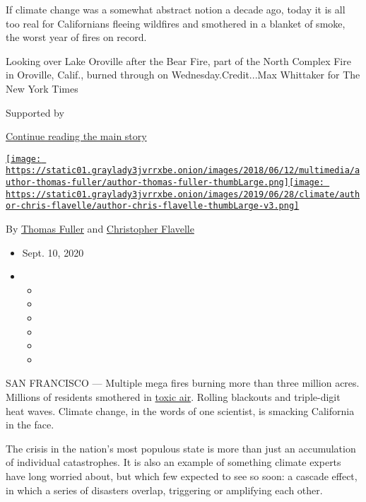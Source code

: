 If climate change was a somewhat abstract notion a decade ago, today it
is all too real for Californians fleeing wildfires and smothered in a
blanket of smoke, the worst year of fires on record.

Looking over Lake Oroville after the Bear Fire, part of the North
Complex Fire in Oroville, Calif., burned through on
Wednesday.Credit...Max Whittaker for The New York Times

Supported by

\protect\hyperlink{after-sponsor}{Continue reading the main story}

\href{https://www.nytimes3xbfgragh.onion/by/thomas-fuller}{\texttt{[image: https://static01.graylady3jvrrxbe.onion/images/2018/06/12/multimedia/author-thomas-fuller/author-thomas-fuller-thumbLarge.png]}}\href{https://www.nytimes3xbfgragh.onion/by/christopher-flavelle}{\texttt{[image: https://static01.graylady3jvrrxbe.onion/images/2019/06/28/climate/author-chris-flavelle/author-chris-flavelle-thumbLarge-v3.png]}}

By \href{https://www.nytimes3xbfgragh.onion/by/thomas-fuller}{Thomas
Fuller} and
\href{https://www.nytimes3xbfgragh.onion/by/christopher-flavelle}{Christopher
Flavelle}

\begin{itemize}
\item
  Sept. 10, 2020
\item
  \begin{itemize}
  \item
  \item
  \item
  \item
  \item
  \item
  \end{itemize}
\end{itemize}

SAN FRANCISCO --- Multiple mega fires burning more than three million
acres. Millions of residents smothered in
\href{https://www.nytimes3xbfgragh.onion/2020/09/11/climate/california-smoke-wildfires.html}{toxic
air}. Rolling blackouts and triple-digit heat waves. Climate change, in
the words of one scientist, is smacking California in the face.

The crisis in the nation's most populous state is more than just an
accumulation of individual catastrophes. It is also an example of
something climate experts have long worried about, but which few
expected to see so soon: a cascade effect, in which a series of
disasters overlap, triggering or amplifying each other.


